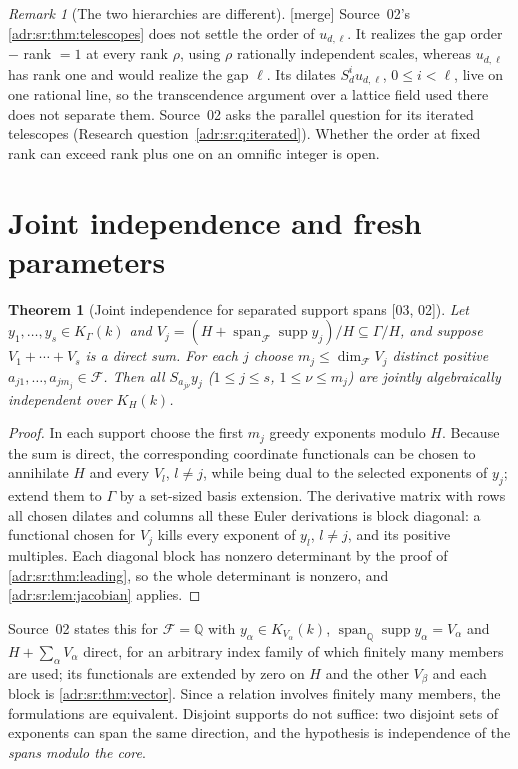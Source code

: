 \documentclass[11pt,letterpaper]{article}
\numberwithin{equation}{section}
\newtheorem{theorem}{Theorem}[section]
\theoremstyle{definition}
\theoremstyle{remark}
\newtheorem{remark}[remark]{Remark}
\newcommand{\Q}{\mathbb Q}
\newcommand{\K}{K_\Gamma(k)}
\newcommand{\supp}{\operatorname{supp}}
\newcommand{\mtag}{\textup{[merge]}}%
\newcommand{\src}[1]{\textup{[#1]}}%
\begin{document}
\begin{remark}[The two hierarchies are different]
\label{adr:sr:rem:udl}
\mtag{} Source~02's \cref{adr:sr:thm:telescopes} does not settle the order of
$u_{d,\ell}$. It realizes the gap order $-$ rank $=1$ at every rank $\rho$,
using $\rho$ rationally independent scales, whereas $u_{d,\ell}$ has rank one
and would realize the gap $\ell$. Its dilates $S_d^iu_{d,\ell}$, $0\le i<\ell$,
live on one rational line, so the transcendence argument over a lattice field
used there does not separate them. Source~02 asks the parallel question for its
iterated telescopes (Research question~\ref{adr:sr:q:iterated}). Whether the
order at fixed rank can exceed rank plus one on an omnific integer is open.
\end{remark}

\section{Joint independence and fresh parameters}
\label{adr:sr:sec:fresh}

\begin{theorem}[Joint independence for separated support spans \src{03, 02}]
\label{adr:sr:thm:blocks}
Let $y_1,\ldots,y_s\in\K$ and $V_j=(H+\operatorname{span}_{\mathcal F}\supp y_j)/H\subseteq\Gamma/H$,
and suppose $V_1+\cdots+V_s$ is a direct sum. For each $j$ choose
$m_j\le\dim_{\mathcal F}V_j$ distinct positive $a_{j1},\ldots,a_{jm_j}\in\mathcal F$.
Then all $S_{a_{j\nu}}y_j$ ($1\le j\le s$, $1\le\nu\le m_j$) are jointly
algebraically independent over $K_H(k)$.
\end{theorem}
\begin{proof}
In each support choose the first $m_j$ greedy exponents modulo $H$. Because
the sum is direct, the corresponding coordinate functionals can be chosen to
annihilate $H$ and every $V_l$, $l\ne j$, while being dual to the selected
exponents of $y_j$; extend them to $\Gamma$ by a set-sized basis extension.
The derivative matrix with rows all chosen dilates and columns all these
Euler derivations is block diagonal: a functional chosen for $V_j$ kills every
exponent of $y_l$, $l\ne j$, and its positive multiples. Each diagonal block
has nonzero determinant by the proof of \cref{adr:sr:thm:leading}, so the whole
determinant is nonzero, and \cref{adr:sr:lem:jacobian} applies.
\end{proof}

Source~02 states this for $\mathcal F=\Q$ with $y_\alpha\in K_{V_\alpha}(k)$,
$\operatorname{span}_\Q\supp y_\alpha=V_\alpha$ and $H+\sum_\alpha V_\alpha$
direct, for an arbitrary index family of which finitely many members are used;
its functionals are extended by zero on $H$ and the other $V_\beta$ and each
block is \cref{adr:sr:thm:vector}. Since a relation involves finitely many
members, the formulations are equivalent. Disjoint supports do not suffice:
two disjoint sets of exponents can span the same direction, and the hypothesis
is independence of the \emph{spans modulo the core}.
\end{document}
